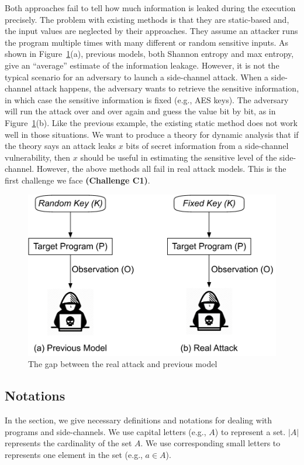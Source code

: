 Both approaches fail to tell how much information is leaked during the execution
precisely. The problem with existing methods is that they are static-based and,
the input values are neglected by their approaches. They assume an attacker runs
the program multiple times with many different or random sensitive inputs. As
shown in Figure~\ref{fig:gap}(a), previous models, both Shannon entropy and max
entropy, give an ``average'' estimate of the information leakage. However, it is
not the typical scenario for an adversary to launch a side-channel attack. When
a side-channel attack happens, the adversary wants to retrieve the sensitive
information, in which case the sensitive information is fixed (e.g., AES keys).
The adversary will run the attack over and over again and guess the value bit by
bit, as in Figure~\ref{fig:gap}(b). Like the previous example, the existing
static method does not work well in those situations. We want to produce a
theory for dynamic analysis that if the theory says an attack leaks $x$ bits of
secret information from a side-channel vulnerability, then $x$ should be useful
in estimating the sensitive level of the side-channel. However, the above
methods all fail in real attack models. This is the first challenge we face
\textbf{(Challenge C1)}.

\begin{figure}
    \centering
    \includegraphics[width=.8\columnwidth]{./figures/RA.pdf}
    \caption{The gap between the real attack and previous model}\label{fig:gap}
\end{figure}


\subsection{Notations}
In the section, we give necessary definitions and notations for dealing with
programs and side-channels. We use capital letters (e.g., $A$) to represent a
set. $|A|$ represents the cardinality of the set $A$. We use corresponding small
letters to represents one element in the set (e.g., $a \in A$).

